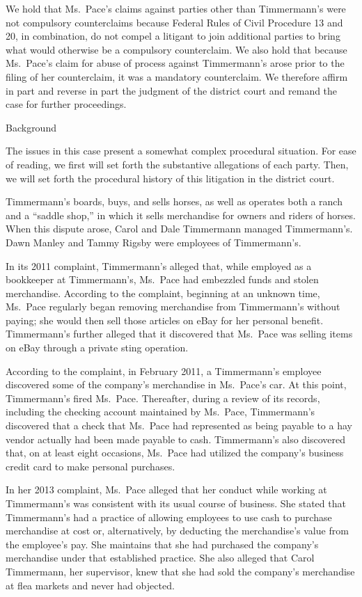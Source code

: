 \documentclass[11pt,letterpaper,twoside]{article}
\begin{document}
We hold that Ms.~Pace's claims against parties other than Timmermann's
were not compulsory counterclaims because Federal Rules of Civil
Procedure 13 and 20, in combination, do not compel a litigant to join
additional parties to bring what would otherwise be a compulsory
counterclaim. We also hold that because Ms.~Pace's claim for abuse of
process against Timmermann's arose prior to the filing of her
counterclaim, it was a mandatory counterclaim. We therefore affirm in
part and reverse in part the judgment of the district court and remand
the case for further proceedings.

{Background}

The issues in this case present a somewhat complex procedural situation.
For ease of reading, we first will set forth the substantive allegations
of each party. Then, we will set forth the procedural history of this
litigation in the district court.

Timmermann's boards, buys, and sells horses, as well as operates both a
ranch and a ``saddle shop,'' in which it sells merchandise for owners
and riders of horses. When this dispute arose, Carol and Dale Timmermann
managed Timmermann's. Dawn Manley and Tammy Rigsby were employees of
Timmermann's.

In its 2011 complaint, Timmermann's alleged that, while employed as a
bookkeeper at Timmermann's, Ms.~Pace had embezzled funds and stolen
merchandise. According to the complaint, beginning at an unknown time,
Ms.~Pace regularly began removing merchandise from Timmermann's without
paying; she would then sell those articles on eBay for her personal
benefit. Timmermann's further alleged that it discovered that Ms.~Pace
was selling items on eBay through a private sting operation.

According to the complaint, in February 2011, a Timmermann's employee
discovered some of the company's merchandise in Ms.~Pace's car. At this
point, Timmermann's fired Ms.~Pace. Thereafter, during a review of its
records, including the checking account maintained by Ms.~Pace,
Timmermann's discovered that a check that Ms.~Pace had represented as
being payable to a hay vendor actually had been made payable to cash.
Timmermann's also discovered that, on at least eight occasions, Ms.~Pace
had utilized the company's business credit card to make personal
purchases.

In her 2013 complaint, Ms.~Pace alleged that her conduct while working
at Timmermann's was consistent with its usual course of business. She
stated that Timmermann's had a practice of allowing employees to use
cash to purchase merchandise at cost or, alternatively, by deducting the
merchandise's value from the employee's pay. She maintains that she had
purchased the company's merchandise under that established practice. She
also alleged that Carol Timmermann, her supervisor, knew that she had
sold the company's merchandise at flea markets and never had objected.
\end{document}
